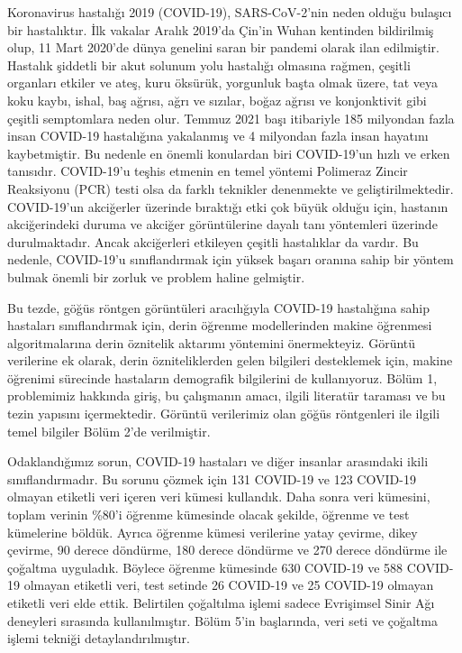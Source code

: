 Koronavirus hastalığı 2019 (COVID-19), SARS-CoV-2'nin neden olduğu bulaşıcı bir hastalıktır. İlk vakalar Aralık 2019'da Çin'in Wuhan kentinden bildirilmiş olup, 11 Mart 2020'de dünya genelini saran bir pandemi olarak ilan edilmiştir. Hastalık şiddetli bir akut solunum yolu hastalığı olmasına rağmen, çeşitli organları etkiler ve ateş, kuru öksürük, yorgunluk başta olmak üzere, tat veya koku kaybı, ishal, baş ağrısı, ağrı ve sızılar, boğaz ağrısı ve konjonktivit gibi çeşitli semptomlara neden olur. Temmuz 2021 başı itibariyle 185 milyondan fazla insan COVID-19 hastalığına yakalanmış ve 4 milyondan fazla insan hayatını kaybetmiştir. Bu nedenle en önemli konulardan biri COVID-19'un hızlı ve erken tanısıdır. COVID-19'u teşhis etmenin en temel yöntemi Polimeraz Zincir Reaksiyonu (PCR) testi olsa da farklı teknikler denenmekte ve geliştirilmektedir. COVID-19'un akciğerler üzerinde bıraktığı etki çok büyük olduğu için, hastanın akciğerindeki duruma ve akciğer görüntülerine dayalı tanı yöntemleri üzerinde durulmaktadır. Ancak akciğerleri etkileyen çeşitli hastalıklar da vardır. Bu nedenle, COVID-19'u sınıflandırmak için yüksek başarı oranına sahip bir yöntem bulmak önemli bir zorluk ve problem haline gelmiştir.

Bu tezde, göğüs röntgen görüntüleri aracılığıyla COVID-19 hastalığına sahip hastaları sınıflandırmak için, derin öğrenme modellerinden makine öğrenmesi algoritmalarına derin öznitelik aktarımı yöntemini önermekteyiz. Görüntü verilerine ek olarak, derin özniteliklerden gelen bilgileri desteklemek için, makine öğrenimi sürecinde hastaların demografik bilgilerini de kullanıyoruz. Bölüm 1, problemimiz hakkında giriş, bu çalışmanın amacı, ilgili literatür taraması ve bu tezin yapısını içermektedir. Görüntü verilerimiz olan göğüs röntgenleri ile ilgili temel bilgiler Bölüm 2'de verilmiştir.

Odaklandığımız sorun, COVID-19 hastaları ve diğer insanlar arasındaki ikili sınıflandırmadır. Bu sorunu çözmek için 131 COVID-19 ve 123 COVID-19 olmayan etiketli veri içeren veri kümesi kullandık. Daha sonra veri kümesini, toplam verinin \%80'i öğrenme kümesinde olacak şekilde, öğrenme ve test kümelerine böldük. Ayrıca öğrenme kümesi verilerine yatay çevirme, dikey çevirme, 90 derece döndürme, 180 derece döndürme ve 270 derece döndürme ile çoğaltma uyguladık. Böylece öğrenme kümesinde 630 COVID-19 ve 588 COVID-19 olmayan etiketli veri, test setinde 26 COVID-19 ve 25 COVID-19 olmayan etiketli veri elde ettik. Belirtilen çoğaltılma işlemi sadece Evrişimsel Sinir Ağı deneyleri sırasında kullanılmıştır. Bölüm 5'in başlarında, veri seti ve çoğaltma işlemi tekniği detaylandırılmıştır.

